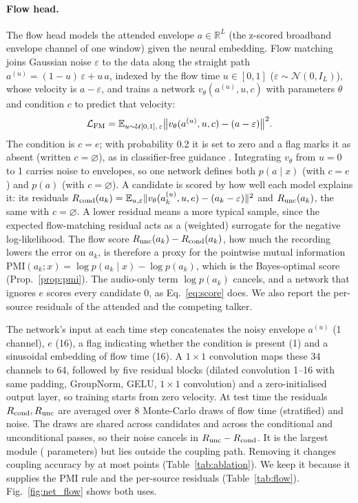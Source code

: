 \documentclass[10pt,twocolumn,letterpaper]{article}
\newcommand{\PMI}{\mathrm{PMI}}
\begin{document}
\paragraph{Flow head.} The flow head models the attended envelope $a\in\mathbb R^{L}$ (the
z-scored broadband envelope channel of one window) given the neural embedding.
Flow matching joins Gaussian noise $\varepsilon$ to the data
along the straight path $a^{(u)}=(1-u)\,\varepsilon+u\,a$, indexed by the flow time
$u\in[0,1]$ ($\varepsilon\sim\mathcal N(0,I_L)$), whose velocity is $a-\varepsilon$, and trains a
network $v_\theta(a^{(u)},u,c)$ with parameters $\theta$ and condition $c$ to predict that
velocity:
\begin{equation}
\mathcal L_{\rm FM}=\mathbb E_{u\sim\mathcal U[0,1],\,\varepsilon}\big\|v_\theta(a^{(u)},u,c)-(a-\varepsilon)\big\|^2 .
\label{eq:fm}
\end{equation}
The condition is $c=e$; with probability 0.2 it is set to zero and a flag marks it as
absent (written $c=\varnothing$), as in classifier-free guidance \citep{ho2022classifierfree}. Integrating $v_\theta$ from $u=0$ to 1 carries noise to
envelopes, so one network defines both $p(a\mid x)$ (with $c=e$) and $p(a)$ (with
$c=\varnothing$).
A candidate is scored by how well each model explains it: its residuals
$R_{\rm cond}(a_k)=\mathbb E_{u,\varepsilon}\|v_\theta(a_k^{(u)},u,e)-(a_k-\varepsilon)\|^2$ and
$R_{\rm unc}(a_k)$, the same with $c=\varnothing$. A lower residual means a more typical sample,
since the expected flow-matching residual acts as a (weighted) surrogate for the negative
log-likelihood. The flow score $R_{\rm unc}(a_k)-R_{\rm cond}(a_k)$, how much the recording lowers the error
on $a_k$, is therefore a proxy for the pointwise mutual information
$\PMI(a_k;x)=\log p(a_k\mid x)-\log p(a_k)$, which is the Bayes-optimal score (Prop.~\ref{prop:pmi}). The audio-only term $\log p(a_k)$ cancels, and
a network that ignores $e$ scores every candidate 0, as Eq.~\ref{eq:score} does.
We also report the per-source residuals of the attended and the competing talker.

The network's input at each time step concatenates the noisy envelope $a^{(u)}$ (1 channel),
$e$ (16), a flag indicating whether the condition is present (1) and a sinusoidal
embedding of flow time (16). A $1{\times}1$ convolution maps these 34 channels to 64,
followed by five residual blocks (dilated convolution 1--16 with same padding, GroupNorm,
GELU, $1{\times}1$ convolution) and a zero-initialised output layer, so training starts
from zero velocity. At test time the residuals $R_{\rm cond},R_{\rm unc}$ are averaged over 8
Monte-Carlo draws of flow time (stratified) and noise. The draws are shared across
candidates and across the conditional and unconditional passes, so their noise cancels in
$R_{\rm unc}-R_{\rm cond}$. It is the largest module (\archFlow{} parameters) but lies outside the coupling
path. Removing it changes coupling accuracy by at most \ablOtherMax{} points
(Table~\ref{tab:ablation}). We keep it because it supplies the PMI rule and the
per-source residuals (Table~\ref{tab:flow}). Fig.~\ref{fig:net_flow} shows both uses.
\end{document}
